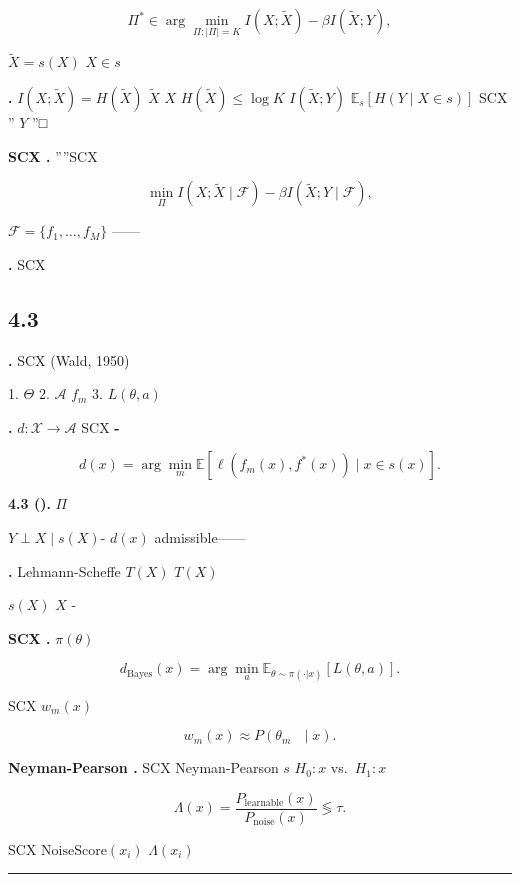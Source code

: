 \documentclass[
  12pt,
]{article}
\begin{document}
\[\Pi^* \in \arg\min_{\Pi: |\Pi| = K} I(X; \tilde{X}) - \beta I(\tilde{X}; Y),\]

 \(\tilde{X} = s(X)\)  \(X \in s\)

\textbf{.}  \(I(X; \tilde{X}) = H(\tilde{X})\)
\(\tilde{X}\)  \(X\) 
\(H(\tilde{X}) \leq \log K\) \(I(\tilde{X}; Y)\) 
\(\mathbb{E}_s[H(Y \mid X \in s)]\) SCX '' \(Y\)
''□

\textbf{SCX .} ''''SCX
\textbf{}

\[\min_{\Pi} I(X; \tilde{X} \mid \mathcal{F}) - \beta I(\tilde{X}; Y \mid \mathcal{F}),\]

 \(\mathcal{F} = \{f_1, \dots, f_M\}\)
------

\textbf{.} SCX
\textbf{}

\subsection{4.3 }\label{ux51b3ux7b56ux8bbaux63a8ux5bfc}

\textbf{.} SCX \textbf{} (Wald, 1950)


\textbf{} 1. \textbf{}
\(\Theta\) 2. \textbf{}
\(\mathcal{A}\) \(f_m\) 3. \textbf{}
\(L(\theta, a)\)

\textbf{.}  \(d: \mathcal{X} \to \mathcal{A}\)
SCX \textbf{-}

\[d(x) = \arg\min_m \mathbb{E}[\ell(f_m(x), f^*(x)) \mid x \in s(x)].\]

\textbf{ 4.3 ().}  \(\Pi\)

\(Y \perp X \mid s(X)\)- \(d(x)\)
\textbf{}admissible------

\textbf{.} Lehmann-Scheffe 
\(T(X)\)  \(T(X)\) 

 \(s(X)\)  \(X\)
-

\textbf{SCX .}  \(\pi(\theta)\)


\[d_{\text{Bayes}}(x) = \arg\min_a \mathbb{E}_{\theta \sim \pi(\cdot|x)}[L(\theta, a)].\]

SCX  \(w_m(x)\) \textbf{}

\[w_m(x) \approx P(\theta_m \text{ } \mid x).\]

\textbf{Neyman-Pearson .} SCX  Neyman-Pearson
 \(s\)  \(H_0: x\) 
vs.~\(H_1: x\) 

\[\Lambda(x) = \frac{P_{\text{learnable}}(x)}{P_{\text{noise}}(x)} \lessgtr \tau.\]

SCX  \(\text{NoiseScore}(x_i)\)  \(\Lambda(x_i)\)


\begin{center}\rule{0.5\linewidth}{0.5pt}\end{center}
\end{document}
